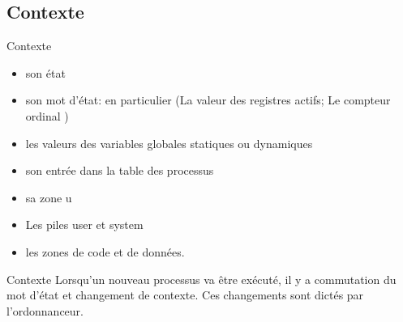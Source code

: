 \begin{frame}{\sectitle}
\def\subsectitle{Contexte}
\subsection{\subsectitle}

\begin{block}{\subsectitle}
\begin{itemize}
\item son état
\item son mot d'état: en particulier
          (La valeur des registres actifs; Le compteur ordinal )
\item les valeurs des variables globales statiques ou dynamiques
\item son entrée dans la table des processus
\item sa zone u
\item Les piles user et system
\item les zones de code et de données. 
\end{itemize}
\end{block}

\begin{block}{\subsectitle}
Lorsqu'un nouveau processus va être exécuté, il y a commutation du mot d'état et changement de contexte.
Ces changements sont dictés par l'ordonnanceur.
\end{block}
\end{frame}



\def\sectitle{Mécanisme de contrôle}
